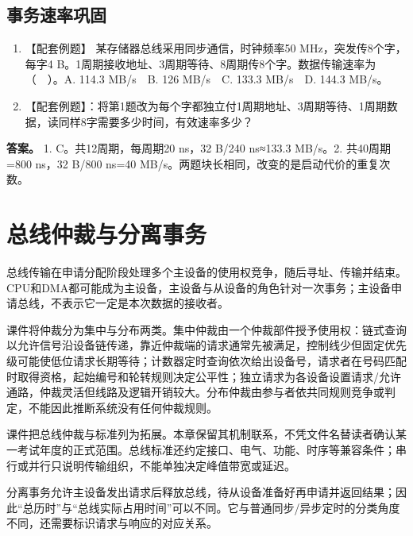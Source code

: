 \subsection{事务速率巩固}\label{CO06-old-self}

\begin{enumerate}
\def\labelenumi{\arabic{enumi}.}
\tightlist
\item
  【配套例题】 某存储器总线采用同步通信，时钟频率50 MHz，突发传8个字，每字4 B。1周期接收地址、3周期等待、8周期传8个字。数据传输速率为（　）。A. 114.3 MB/s　B. 126 MB/s　C. 133.3 MB/s　D. 144.3 MB/s。
\item
  【配套例题】：将第1题改为每个字都独立付1周期地址、3周期等待、1周期数据，读同样8字需要多少时间，有效速率多少？
\end{enumerate}

\textbf{答案。} 1. C。共12周期，每周期20 ns，32 B/240 ns≈133.3 MB/s。2. 共40周期=800 ns，32 B/800 ns=40 MB/s。两题块长相同，改变的是启动代价的重复次数。

\section{总线仲裁与分离事务}\label{CO06-arbitration}

总线传输在申请分配阶段处理多个主设备的使用权竞争，随后寻址、传输并结束。CPU和DMA都可能成为主设备，主设备与从设备的角色针对一次事务；主设备申请总线，不表示它一定是本次数据的接收者。

课件将仲裁分为集中与分布两类。集中仲裁由一个仲裁部件授予使用权：链式查询以允许信号沿设备链传递，靠近仲裁端的请求通常先被满足，控制线少但固定优先级可能使低位请求长期等待；计数器定时查询依次给出设备号，请求者在号码匹配时取得资格，起始编号和轮转规则决定公平性；独立请求为各设备设置请求/允许通路，仲裁灵活但线路及逻辑开销较大。分布仲裁由参与者依共同规则竞争或判定，不能因此推断系统没有任何仲裁规则。

课件把总线仲裁与标准列为拓展。本章保留其机制联系，不凭文件名替读者确认某一考试年度的正式范围。总线标准还约定接口、电气、功能、时序等兼容条件；串行或并行只说明传输组织，不能单独决定峰值带宽或延迟。

分离事务允许主设备发出请求后释放总线，待从设备准备好再申请并返回结果；因此``总历时''与``总线实际占用时间''可以不同。它与普通同步/异步定时的分类角度不同，还需要标识请求与响应的对应关系。

